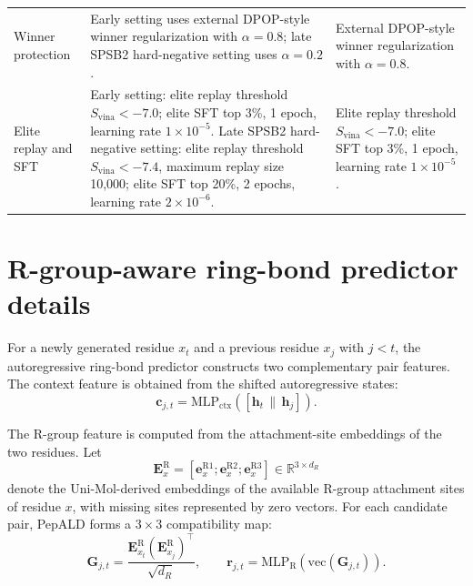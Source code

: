 \documentclass[12pt]{article}
\begin{document}
\begin{center}
\begin{tabular}{L{0.24\textwidth}L{0.31\textwidth}L{0.34\textwidth}}
Winner protection & Early setting uses external DPOP-style winner regularization with \(\alpha=0.8\); late SPSB2 hard-negative setting uses \(\alpha=0.2\). & External DPOP-style winner regularization with \(\alpha=0.8\). \\
Elite replay and SFT & Early setting: elite replay threshold \(S_{\mathrm{vina}}<-7.0\); elite SFT top 3\%, 1 epoch, learning rate \(1\times10^{-5}\). Late SPSB2 hard-negative setting: elite replay threshold \(S_{\mathrm{vina}}<-7.4\), maximum replay size 10,000; elite SFT top 20\%, 2 epochs, learning rate \(2\times10^{-6}\). & Elite replay threshold \(S_{\mathrm{vina}}<-7.0\); elite SFT top 3\%, 1 epoch, learning rate \(1\times10^{-5}\). \\
\bottomrule
\end{tabular}
\endgroup
\end{center}
\FloatBarrier

\section{R-group-aware ring-bond predictor details}

For a newly generated residue $x_t$ and a previous residue $x_j$ with $j<t$, the autoregressive ring-bond predictor constructs two complementary pair features.
The context feature is obtained from the shifted autoregressive states:
\begin{equation}
\mathbf{c}_{j,t}
= \mathrm{MLP}_{\mathrm{ctx}}\!\left([\mathbf{h}_t \,\|\, \mathbf{h}_j]\right).
\label{eq:sup_ring_context}
\end{equation}

The R-group feature is computed from the attachment-site embeddings of the two residues.
Let
\begin{equation}
\mathbf{E}_{x}^{\mathrm{R}}
=
\left[
\mathbf{e}_{x}^{\mathrm{R1}};
\mathbf{e}_{x}^{\mathrm{R2}};
\mathbf{e}_{x}^{\mathrm{R3}}
\right]
\in \mathbb{R}^{3\times d_R}
\label{eq:sup_rgroup_stack}
\end{equation}
denote the Uni-Mol-derived embeddings of the available R-group attachment sites of residue $x$, with missing sites represented by zero vectors.
For each candidate pair, PepALD forms a $3\times 3$ compatibility map:
\begin{equation}
\mathbf{G}_{j,t}
=
\frac{\mathbf{E}_{x_t}^{\mathrm{R}}
\left(\mathbf{E}_{x_j}^{\mathrm{R}}\right)^\top}
{\sqrt{d_R}},
\qquad
\mathbf{r}_{j,t}
=
\mathrm{MLP}_{\mathrm{R}}\!\left(\mathrm{vec}(\mathbf{G}_{j,t})\right).
\label{eq:sup_rgroup_feature}
\end{equation}
\end{document}
